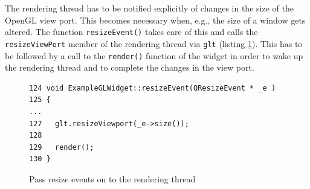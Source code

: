 \documentclass[jou,noapacite]{apa}
\begin{document}
%
The rendering thread has to be notified explicitly of changes in the size of
the OpenGL view port.
%
This becomes necessary when, e.g., the size of a window gets altered.
%
The function \lstinline|resizeEvent()| takes care of this and calls
the \lstinline|resizeViewPort| member of the rendering thread
via \lstinline|glt| (listing \ref{lst:resize}).
%
This has to be followed by a call to the \lstinline|render()| function of the
widget in order to wake up the rendering thread and to complete the changes in
the view port.
%
\begin{figure}[h]
\begin{lstlisting}[basicstyle=\scriptsize]
124 void ExampleGLWidget::resizeEvent(QResizeEvent * _e )
125 {
...
127   glt.resizeViewport(_e->size());
128
129   render();
130 }
\end{lstlisting}
\caption{Pass resize events on to the rendering thread}
\label{lst:resize}
\end{figure}
\end{document}
